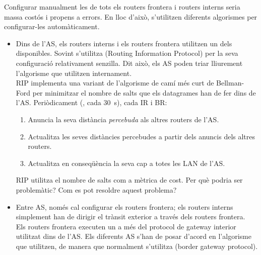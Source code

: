 Configurar manualment les  de tots els routers frontera i routers interns
seria massa costós i propens a errors. En lloc d'això, s'utilitzen diferents algorismes per configurar-les automàticament.
\begin{itemize}
\item Dins de l'AS, els routers interns i els routers frontera utilitzen un dels
 disponibles.
Sovint s'utilitza  (Routing Information Protocol) per la seva configuració relativament senzilla.
Dit això, els AS poden triar lliurement l'algorisme que utilitzen internament.\\[-0.2cm]

RIP implementa una variant de l'algorisme de camí més curt de Bellman-Ford per minimitzar el nombre de salts
que els datagrames han de fer dins de l'AS. Periòdicament (\eg, cada $30$~s), cada IR i BR:\\[-0.4cm]
% 
  \begin{enumerate}
  \item Anuncia la seva distància \textit{percebuda} als altres routers de l'AS.
  \item Actualitza les seves distàncies percebudes a partir dels anuncis dels altres routers.
  \item Actualitza en conseqüència la seva  cap a totes les LAN de l'AS.
  \end{enumerate}

\begin{exercise}
RIP utilitza el nombre de salts com a mètrica de cost.
% 
Per què podria ser problemàtic?
% 
Com es pot resoldre aquest problema?
\end{exercise}

\vspace{0.25cm}
\item Entre AS, només cal configurar els routers frontera; els routers interns simplement han de dirigir
el trànsit exterior a través dels routers frontera. \\[-0.3cm]

Els routers frontera executen un  a més del
protocol de gateway interior utilitzat dins de l'AS. Els diferents AS s'han de posar d'acord en
l'algorisme que utilitzen, de manera que normalment s'utilitza  (border gateway protocol).\\[-0.3cm]


\end{itemize}
